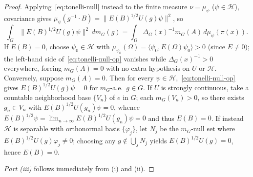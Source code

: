 \documentclass[11pt,a4paper]{article}
\theoremstyle{definition}
\theoremstyle{remark}
\newcommand{\HH}{\mathcal{H}}
\newcommand{\ip}[2]{\langle #1, #2 \rangle}
\newcommand{\norm}[1]{\|#1\|}
\begin{document}
\begin{proof}
Applying~\eqref{eq:tonelli-null} instead to the finite measure $\nu=\mu_\psi$ ($\psi\in\HH$), covariance gives $\mu_\psi(g^{-1}\cdot B)=\norm{E(B)^{1/2}U(g)\psi}^2$, so
\begin{equation}\label{eq:tonelli-null-op}
\int_G \norm{E(B)^{1/2}U(g)\psi}^2\,dm_G(g) = \int_\Omega \Delta_G(x)^{-1}m_G(A)\,d\mu_\psi(\pi(x)).
\end{equation}
If $E(B)=0$, choose $\psi_0\in\HH$ with $\mu_{\psi_0}(\Omega)=\ip{\psi_0}{E(\Omega)\psi_0}>0$ (since $E\neq 0$); the left-hand side of~\eqref{eq:tonelli-null-op} vanishes while $\Delta_G(x)^{-1}>0$ everywhere, forcing $m_G(A)=0$ with no extra hypothesis on $U$ or $\HH$. Conversely, suppose $m_G(A)=0$. Then for every $\psi\in\HH$,~\eqref{eq:tonelli-null-op} gives $E(B)^{1/2}U(g)\psi=0$ for $m_G$-a.e.\ $g\in G$. If $U$ is strongly continuous, take a countable neighborhood base $\{V_n\}$ of $e$ in $G$; each $m_G(V_n)>0$, so there exists $g_n\in V_n$ with $E(B)^{1/2}U(g_n)\psi=0$, whence $E(B)^{1/2}\psi=\lim_{n\to\infty}E(B)^{1/2}U(g_n)\psi=0$ and thus $E(B)=0$. If instead $\HH$ is separable with orthonormal basis $\{\varphi_j\}$, let $N_j$ be the $m_G$-null set where $E(B)^{1/2}U(g)\varphi_j\neq 0$; choosing any $g\notin\bigcup_j N_j$ yields $E(B)^{1/2}U(g)=0$, hence $E(B)=0$.

\emph{Part (iii)} follows immediately from (i) and (ii).
\end{proof}
\end{document}
